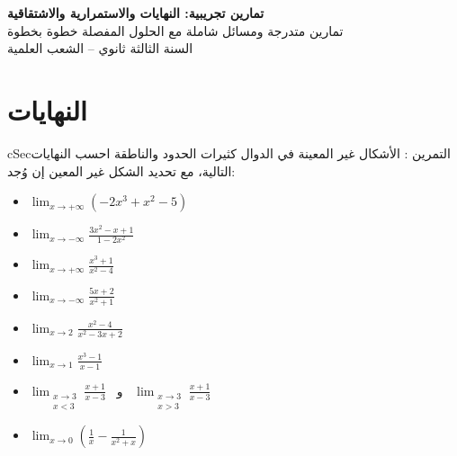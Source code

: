 \documentclass[12pt,a4paper]{article}
\newenvironment{BOX}[2]{\begin{otherlanguage}{english}\begin{arbox}{#1}{#2}}{\end{arbox}\end{otherlanguage}}
\newcounter{exo}
\newenvironment{tamrin}[1]{\stepcounter{exo}\begin{BOX}{cSec}{التمرين \theexo: #1}}{\end{BOX}}
\newenvironment{LTR}{\begin{otherlanguage}{english}}{\end{otherlanguage}}
\newenvironment{sq}{\begin{itemize}[leftmargin=2.4em,itemsep=3pt]}{\end{itemize}}
\newcommand{\qa}{\item[(أ)]}\newcommand{\qb}{\item[(ب)]}\newcommand{\qc}{\item[(جـ)]}\newcommand{\qd}{\item[(د)]}\newcommand{\qe}{\item[(هـ)]}
\begin{document}
\begin{LTR}
\begin{tcolorbox}[enhanced,colback=cSec,colframe=cSec,arc=3mm,halign=center,boxrule=0pt,top=12pt,bottom=12pt,before upper={\selectlanguage{arabic}}]
{\color{white}\fontsize{22}{30}\selectfont\bfseries تمارين تجريبية: النهايات والاستمرارية والاشتقاقية}\\[8pt]
{\color{white}\large تمارين متدرجة ومسائل شاملة مع الحلول المفصلة خطوة بخطوة}\\[5pt]
{\color{white}\large السنة الثالثة ثانوي -- الشعب العلمية}
\end{tcolorbox}
\end{LTR}
\section{النهايات}
\begin{tamrin}{الأشكال غير المعينة في الدوال كثيرات الحدود والناطقة}
احسب النهايات التالية، مع تحديد الشكل غير المعين إن وُجد:
\begin{sq}
\qa $\displaystyle\lim_{x\to+\infty}\left(-2x^{3}+x^{2}-5\right)$
\qb $\displaystyle\lim_{x\to-\infty}\frac{3x^{2}-x+1}{1-2x^{2}}$
\qc $\displaystyle\lim_{x\to+\infty}\frac{x^{3}+1}{x^{2}-4}$
\qd $\displaystyle\lim_{x\to-\infty}\frac{5x+2}{x^{2}+1}$
\qe $\displaystyle\lim_{x\to2}\frac{x^{2}-4}{x^{2}-3x+2}$
\item[(و)] $\displaystyle\lim_{x\to1}\frac{x^{3}-1}{x-1}$
\item[(ز)] $\displaystyle\lim_{\substack{x\to3\\ x<3}}\frac{x+1}{x-3}$ \ و \ $\displaystyle\lim_{\substack{x\to3\\ x>3}}\frac{x+1}{x-3}$
\item[(ح)] $\displaystyle\lim_{x\to0}\left(\frac{1}{x}-\frac{1}{x^{2}+x}\right)$
\end{sq}
\end{tamrin}
\end{document}
